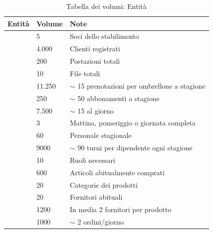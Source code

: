 \begin{table}[htbp]
  \centering
  \caption{Tabella dei volumi: Entità}
  \label{tab:volumi-entità}
  \begin{tabularx}{\textwidth}{L{4cm} R{1.62cm} L{9.1cm}}
    \toprule
    \textbf{Entità} & \textbf{Volume} & \textbf{Note} \\
    \midrule
          & 5         & Soci dello stabilimento \\
               & 4.000     & Clienti registrati \\
            & 200       & Postazioni totali \\
                  & 10        & File totali \\
          & 11.250    & $\sim$ 15 prenotazioni per ombrellone a stagione \\
           & 250       & $\sim$ 50 abbonamenti a stagione \\
     & 7.500     & $\sim$ 15 al giorno \\
     & 3         & Mattina, pomeriggio o giornata completa \\
            & 60        & Personale stagionale \\
                 & 9000      & $\sim$ 90 turni per dipendente ogni stagione \\
              & 10        & Ruoli necessari \\
              & 600       & Articoli abitualmente comprati \\
             & 20        & Categorie dei prodotti \\
             & 20        & Fornitori abituali \\
              & 1200      & In media 2 fornitori per prodotto \\
                & 1000      & $\sim$ 2 ordini/giorno \\
    \bottomrule
  \end{tabularx}
\end{table}

